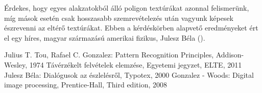 \documentclass[a4paper,12pt]{article}
\begin{document}
Érdekes, hogy egyes alakzatokból álló poligon textúrákat azonnal felismerünk, míg mások esetén csak hosszasabb szemrevételezés után vagyunk képesek észrevenni az eltérő textúrákat. Ebben a kérdéskörben alapvető eredményeket ért el egy híres, magyar származású amerikai fizikus, Julesz Béla (\cite{Julesz}).


\begin{thebibliography}{elek}

 Julius T. Tou, Rafael C. Gonzalez: Pattern Recognition Principles, Addison-Wesley, 1974
 Távérzékelt felvételek elemzése, Egyetemi jegyzet, ELTE, 2011
 Julesz Béla: Dialógusok az észlelésről, Typotex, 2000
 Gonzalez - Woods: Digital image processing, Prentice-Hall, Third edition, 2008
\end{thebibliography}
\end{document}
